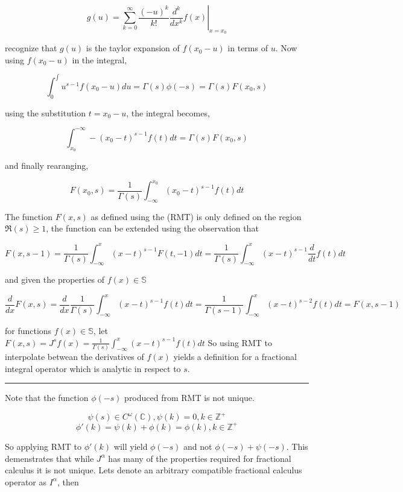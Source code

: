 \documentclass[%
 preprint,
 amsmath, amssymb, aps, pra, 10pt
]{revtex4-2}
\begin{document}
\[g(u) = \sum_{k=0}^\infty \frac{(-u)^k}{k!} \left. \frac{d^k}{dx^k}f(x)\right|_{x=x_0}\]

recognize that $g(u)$ is the taylor expansion of $f(x_0 - u)$ in terms of $u$. Now using $f(x_0 - u)$ in the integral,

\[\int_0^{\int} u^{s-1}f(x_0 - u)du = \Gamma(s)\phi(-s) = \Gamma(s)F(x_0, s)\]

using the substitution $t = x_0 - u$, the integral becomes,


\[\int_{x_0}^{-\infty} -(x_0 - t)^{s-1}f(t)dt = \Gamma(s)F(x_0, s)\]

and finally rearanging,

\[F(x_0, s) = \frac{1}{\Gamma(s)} \int_{-\infty}^{x_0} (x_0 - t)^{s-1} f(t)dt\]

The function $F(x, s)$ as defined using the (RMT) is only defined on the region $\mathfrak{R}(s) \geq 1$, the function can be extended using the observation that

\[F(x, s-1) = \frac{1}{\Gamma(s)} \int_{-\infty}^{x} (x - t)^{s-1} F(t, -1)dt = \frac{1}{\Gamma(s)} \int_{-\infty}^{x} (x - t)^{s-1} \frac{d}{dt}f(t)dt\]

and given the properties of $f(x) \in \mathbb{S}$

\[\frac{d}{dx}F(x, s) = \frac{d}{dx}\frac{1}{\Gamma(s)} \int_{-\infty}^{x} (x - t)^{s-1} f(t)dt = \frac{1}{\Gamma(s - 1)} \int_{-\infty}^{x} (x - t)^{s - 2} f(t)dt = F(x, s - 1)\]

for functions $f(x) \in \mathbb{S}$, let $F(x, s) = J^{s}f(x) = \frac{1}{\Gamma(s)} \int_{-\infty}^{x} (x - t)^{s-1} f(t)dt$
So using RMT to interpolate betwean the derivatives of $f(x)$ yields a definition for a fractional integral operator which is analytic in respect to $s$.

\noindent\rule{\textwidth}{1pt}


Note that the function $\phi(-s)$ produced from RMT is not unique.

\[\psi(s) \in C^{\omega}(\mathbb{C}), \psi(k) = 0, k \in \mathbb{Z}^+\]
\[\phi'(k) = \psi(k) + \phi(k) = \phi(k), k \in \mathbb{Z}^+\]

So applying RMT to $\phi'(k)$ will yield $\phi(-s)$ and not $\phi(-s) + \psi(-s)$. This demenstrates that while $J^\alpha$ has many of the properties required for fractional calculus it is not unique. Lets denote an arbitrary compatible fractional calculus operator as $I^\alpha$, then
\end{document}
